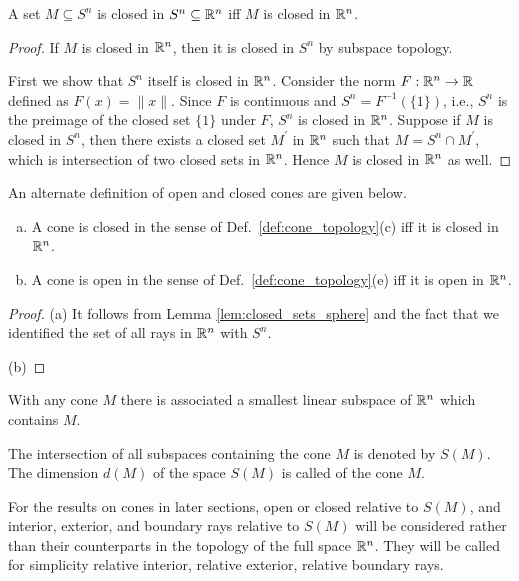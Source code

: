 \documentclass[11pt,a4paper]{article}
\begin{document}
\begin{lemma}\label{lem:closed_sets_sphere}
    A set $M\subseteq S^n$ is closed in $S^n\subseteq \mathbb{R}^n$ iff $M$ is closed in $\mathbb{R}^n$.
\end{lemma}

\begin{proof}
    \converse If $M$ is closed in $\mathbb{R}^n$, then it is closed in $S^n$ by subspace topology. 
    
    \forward First we show that $S^n$ itself is closed in $\mathbb{R}^n$. Consider the norm $F:\mathbb{R}^n\rightarrow \mathbb{R}$ defined as $F(x) = \|x\|$. Since $F$ is continuous and $S^n = F^{-1}(\{1\})$, i.e., $S^n$ is the preimage of the closed set $\{1\}$ under $F$, $S^n$ is closed in $\mathbb{R}^n$. Suppose if $M$ is closed in $S^n$, then there exists a closed set $M^\prime$ in $\mathbb{R}^n$ such that $M = S^n \cap M^\prime$, which is intersection of two closed sets in $\mathbb{R}^n$. Hence $M$ is closed in $\mathbb{R}^n$ as well.
\end{proof}

\begin{proposition}
    An alternate definition of open and closed cones are given below.
    \begin{enumerate}[(a)]
        \item A cone is {closed} in the sense of Def.~\ref{def:cone_topology}(c) iff it is closed in $\mathbb{R}^n$.
        \item A cone is {open} in the sense of Def.~\ref{def:cone_topology}(e) iff it is open in $\mathbb{R}^n$.
    \end{enumerate}
\end{proposition}

\begin{proof}
    (a) It follows from Lemma \ref{lem:closed_sets_sphere} and the fact that we identified the set of all rays in $\mathbb{R}^n$ with $S^n$. 

    (b)
\end{proof}

With any cone $M$ there is associated a smallest linear subspace of $\mathbb{R}^n$ which contains $M$.

\begin{definition}
    The intersection of all subspaces containing the cone $M$ is denoted by $S(M)$. The dimension $d(M)$ of the space $S(M)$ is called  of the cone $M$.
\end{definition}

For the results on cones in later sections, open or closed relative to $S(M)$, and interior, exterior, and boundary rays relative to $S(M)$ will be considered rather than their counterparts in the topology of the full space $\mathbb{R}^n$. They will be called for simplicity relative interior, relative exterior, relative boundary rays.
\end{document}
